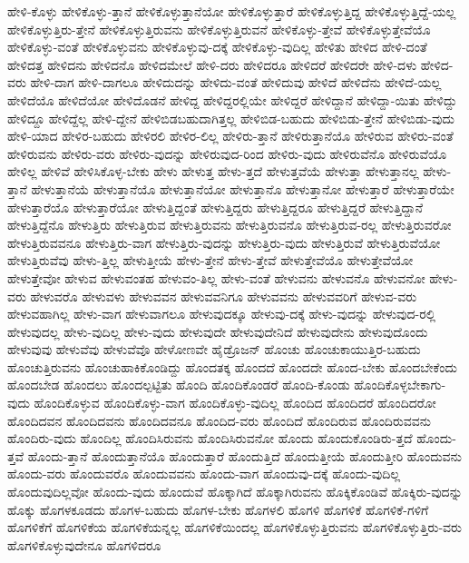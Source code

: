 {ಹೇಳಿ-ಕೊಳ್ಳು
ಹೇಳಿಕೊಳ್ಳು-ತ್ತಾನೆ
ಹೇಳಿಕೊಳ್ಳುತ್ತಾನೆಯೋ
ಹೇಳಿಕೊಳ್ಳುತ್ತಾರೆ
ಹೇಳಿಕೊಳ್ಳುತ್ತಿದ್ದ
ಹೇಳಿಕೊಳ್ಳುತ್ತಿದ್ದೆ-ಯಲ್ಲ
ಹೇಳಿಕೊಳ್ಳುತ್ತಿರು-ತ್ತೇನೆ
ಹೇಳಿಕೊಳ್ಳುತ್ತಿರುವನು
ಹೇಳಿಕೊಳ್ಳುತ್ತಿರುವನೆ
ಹೇಳಿಕೊಳ್ಳು-ತ್ತೇವೆ
ಹೇಳಿಕೊಳ್ಳುತ್ತೇವೆಯೊ
ಹೇಳಿಕೊಳ್ಳು-ವಂತೆ
ಹೇಳಿಕೊಳ್ಳುವನು
ಹೇಳಿಕೊಳ್ಳುವು-ದಕ್ಕೆ
ಹೇಳಿಕೊಳ್ಳು-ವುದಿಲ್ಲ
ಹೇಳಿತು
ಹೇಳಿದ
ಹೇಳಿ-ದಂತೆ
ಹೇಳಿದತ್ತ
ಹೇಳಿದನು
ಹೇಳಿದನೊ
ಹೇಳಿದಮೇಲೆ
ಹೇಳಿ-ದರು
ಹೇಳಿದರೂ
ಹೇಳಿದರೆ
ಹೇಳಿದರೇ
ಹೇಳಿ-ದಳು
ಹೇಳಿದ-ವರು
ಹೇಳಿ-ದಾಗ
ಹೇಳಿ-ದಾಗಲೂ
ಹೇಳಿದುದನ್ನು
ಹೇಳಿದು-ವಂತೆ
ಹೇಳಿದುವು
ಹೇಳಿದೆ
ಹೇಳಿದೆನು
ಹೇಳಿದೆ-ಯಲ್ಲ
ಹೇಳಿದೆಯೊ
ಹೇಳಿದೆಯೋ
ಹೇಳಿದೊಡನೆ
ಹೇಳಿದ್ದ
ಹೇಳಿದ್ದರಲ್ಲಿಯೇ
ಹೇಳಿದ್ದರೆ
ಹೇಳಿದ್ದಾನೆ
ಹೇಳಿದ್ದಾ-ಯಿತು
ಹೇಳಿದ್ದು
ಹೇಳಿದ್ದೂ
ಹೇಳಿದ್ದೆಲ್ಲ
ಹೇಳಿ-ದ್ದೇನೆ
ಹೇಳಿಬಿಡಬಹುದಾಗಿತ್ತಲ್ಲ
ಹೇಳಿಬಿಡ-ಬಹುದು
ಹೇಳಿಬಿಡು-ತ್ತೇನೆ
ಹೇಳಿಬಿಡು-ವುದು
ಹೇಳಿ-ಯಾದ
ಹೇಳಿರ-ಬಹುದು
ಹೇಳಿರಲಿ
ಹೇಳಿರ-ಲಿಲ್ಲ
ಹೇಳಿರು-ತ್ತಾನೆ
ಹೇಳಿರುತ್ತಾನೆಯೊ
ಹೇಳಿರುವ
ಹೇಳಿರು-ವಂತೆ
ಹೇಳಿರುವನು
ಹೇಳಿರು-ವರು
ಹೇಳಿರು-ವುದನ್ನು
ಹೇಳಿರುವುದ-ರಿಂದ
ಹೇಳಿರು-ವುದು
ಹೇಳಿರುವೆನೊ
ಹೇಳಿರುವೆಯೊ
ಹೇಳಿಲ್ಲ
ಹೇಳಿವೆ
ಹೇಳಿಸಿಕೊಳ್ಳ-ಬೇಕು
ಹೇಳು
ಹೇಳುತ್ತ
ಹೇಳು-ತ್ತದೆ
ಹೇಳುತ್ತವೆಯೆ
ಹೇಳುತ್ತಾ
ಹೇಳುತ್ತಾನಲ್ಲ
ಹೇಳು-ತ್ತಾನೆ
ಹೇಳುತ್ತಾನೆಯೆ
ಹೇಳುತ್ತಾನೆಯೊ
ಹೇಳುತ್ತಾನೆಯೋ
ಹೇಳುತ್ತಾನೊ
ಹೇಳುತ್ತಾನೋ
ಹೇಳುತ್ತಾರೆ
ಹೇಳುತ್ತಾರೆಯೇ
ಹೇಳುತ್ತಾರೆಯೊ
ಹೇಳುತ್ತಾರೆಯೋ
ಹೇಳುತ್ತಿದ್ದಂತೆ
ಹೇಳುತ್ತಿದ್ದರು
ಹೇಳುತ್ತಿದ್ದರೂ
ಹೇಳುತ್ತಿದ್ದರೆ
ಹೇಳುತ್ತಿದ್ದಾನೆ
ಹೇಳುತ್ತಿದ್ದೆನೊ
ಹೇಳುತ್ತಿರು
ಹೇಳುತ್ತಿರುವ
ಹೇಳುತ್ತಿರುವನು
ಹೇಳುತ್ತಿರುವನೊ
ಹೇಳುತ್ತಿರುವ-ರಲ್ಲ
ಹೇಳುತ್ತಿರುವರೋ
ಹೇಳುತ್ತಿರುವವನೂ
ಹೇಳುತ್ತಿರು-ವಾಗ
ಹೇಳುತ್ತಿರು-ವುದನ್ನು
ಹೇಳುತ್ತಿರು-ವುದು
ಹೇಳುತ್ತಿರುವೆ
ಹೇಳುತ್ತಿರುವೆಯೋ
ಹೇಳುತ್ತಿರುವೆವು
ಹೇಳು-ತ್ತಿಲ್ಲ
ಹೇಳುತ್ತೀಯೆ
ಹೇಳು-ತ್ತೇನೆ
ಹೇಳು-ತ್ತೇವೆ
ಹೇಳುತ್ತೇವೆಯೊ
ಹೇಳುತ್ತೇವೆಯೋ
ಹೇಳುತ್ತೇವೋ
ಹೇಳುವ
ಹೇಳುವಂತಹ
ಹೇಳುವಂ-ತಿಲ್ಲ
ಹೇಳು-ವಂತೆ
ಹೇಳುವನು
ಹೇಳುವನೊ
ಹೇಳುವನೋ
ಹೇಳು-ವರು
ಹೇಳುವರೊ
ಹೇಳುವಳು
ಹೇಳುವವನ
ಹೇಳುವವನಿಗೂ
ಹೇಳುವವನು
ಹೇಳುವವರಿಗೆ
ಹೇಳುವ-ವರು
ಹೇಳುವಹಾಗಿಲ್ಲ
ಹೇಳು-ವಾಗ
ಹೇಳುವಾಗಲೂ
ಹೇಳುವುದಕ್ಕೂ
ಹೇಳುವು-ದಕ್ಕೆ
ಹೇಳು-ವುದನ್ನು
ಹೇಳುವುದ-ರಲ್ಲಿ
ಹೇಳುವುದಲ್ಲ
ಹೇಳು-ವುದಿಲ್ಲ
ಹೇಳು-ವುದು
ಹೇಳುವುದೇ
ಹೇಳುವುದೇನಿದೆ
ಹೇಳುವುದೇನು
ಹೇಳುವುದೊಂದು
ಹೇಳುವುವು
ಹೇಳುವೆವು
ಹೇಳುವೆವೊ
ಹೇಳೋಣವೇ
ಹೈಡ್ರೊಜನ್
ಹೊಂಚು
ಹೊಂಚುಕಾಯುತ್ತಿರ-ಬಹುದು
ಹೊಂಚುತ್ತಿರುವನು
ಹೊಂಚುಹಾಕಿಕೊಂಡಿದ್ದು
ಹೊಂದತಕ್ಕ
ಹೊಂದದೆ
ಹೊಂದದೇ
ಹೊಂದ-ಬೇಕು
ಹೊಂದಬೇಕೆಂದು
ಹೊಂದಬೇಡ
ಹೊಂದಲು
ಹೊಂದಲ್ಪಟ್ಟಿತು
ಹೊಂದಿ
ಹೊಂದಿಕೊಂಡರೆ
ಹೊಂದಿ-ಕೊಂಡು
ಹೊಂದಿಕೊಳ್ಳಬೇಕಾಗು-ವುದು
ಹೊಂದಿಕೊಳ್ಳುವ
ಹೊಂದಿಕೊಳ್ಳು-ವಾಗ
ಹೊಂದಿಕೊಳ್ಳು-ವುದಿಲ್ಲ
ಹೊಂದಿದ
ಹೊಂದಿದರೆ
ಹೊಂದಿದರೋ
ಹೊಂದಿದವನ
ಹೊಂದಿದವನು
ಹೊಂದಿದವನೂ
ಹೊಂದಿದ-ವರು
ಹೊಂದಿದೆ
ಹೊಂದಿರುವ
ಹೊಂದಿರುವವನು
ಹೊಂದಿರು-ವುದು
ಹೊಂದಿಲ್ಲ
ಹೊಂದಿಸಿರುವನು
ಹೊಂದಿಸಿರುವನೋ
ಹೊಂದು
ಹೊಂದುಕೊಂಡಿರು-ತ್ತದೆ
ಹೊಂದು-ತ್ತವೆ
ಹೊಂದು-ತ್ತಾನೆ
ಹೊಂದುತ್ತಾನೆಯೊ
ಹೊಂದುತ್ತಾರೆ
ಹೊಂದುತ್ತಿದೆ
ಹೊಂದುತ್ತೀಯೆ
ಹೊಂದುತ್ತೀರಿ
ಹೊಂದುವನು
ಹೊಂದು-ವರು
ಹೊಂದುವರೊ
ಹೊಂದುವವನು
ಹೊಂದು-ವಾಗ
ಹೊಂದುವು-ದಕ್ಕೆ
ಹೊಂದು-ವುದಿಲ್ಲ
ಹೊಂದುವುದಿಲ್ಲವೋ
ಹೊಂದು-ವುದು
ಹೊಂದುವೆ
ಹೊಕ್ಕಾಗಿದೆ
ಹೊಕ್ಕಾಗಿರುವನು
ಹೊಕ್ಕಿಕೊಂಡಿವೆ
ಹೊಕ್ಕಿರು-ವುದನ್ನು
ಹೊಕ್ಕು
ಹೊಗಳಕೂಡದು
ಹೊಗಳ-ಬಹುದು
ಹೊಗಳ-ಬೇಕು
ಹೊಗಳಲಿ
ಹೊಗಳಿ
ಹೊಗಳಿಕೆ
ಹೊಗಳಿಕೆ-ಗಳಿಗೆ
ಹೊಗಳಿಕೆಗೆ
ಹೊಗಳಿಕೆಯ
ಹೊಗಳಿಕೆಯನ್ನಲ್ಲ
ಹೊಗಳಿಕೆಯಿಂದಲ್ಲ
ಹೊಗಳಿಕೊಳ್ಳುತ್ತಿರುವನು
ಹೊಗಳಿಕೊಳ್ಳುತ್ತಿರು-ವರು
ಹೊಗಳಿಕೊಳ್ಳುವುದೇನೂ
ಹೊಗಳಿದರೂ
}
